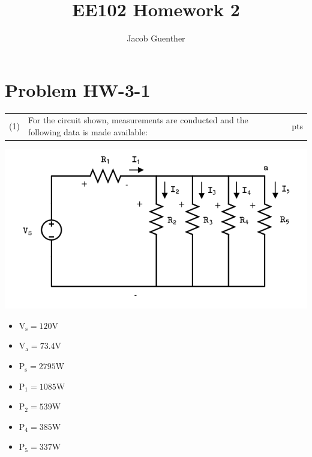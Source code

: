 \documentclass{article}
\title{EE102 Homework 2}
\author{Jacob Guenther}
\newcommand{\problemstatement}[3]{
\noindent
\begin{tabular}{ m{0.5cm} m{42em} m{0.5cm} }
	({#1}) & {#2} & {#3}pts
\end{tabular}
}
\begin{document}


\section{Problem HW-3-1}
\problemstatement{1}{For the circuit shown, measurements are conducted and the following data
is made available:}{}
\includegraphics[width=\textwidth]{problem_1_figure}
\begin{itemize}
	\item $\text{V}_\text{s} = 120 \text{V}$
	\item $\text{V}_\text{a} = 73.4 \text{V}$
	\item $\text{P}_\text{s} = 2795 \text{W}$
	\item $\text{P}_\text{1} = 1085 \text{W}$
	\item $\text{P}_\text{2} = 539 \text{W}$
	\item $\text{P}_\text{4} = 385 \text{W}$
	\item $\text{P}_\text{5} = 337 \text{W}$
\end{itemize}
\end{document}
